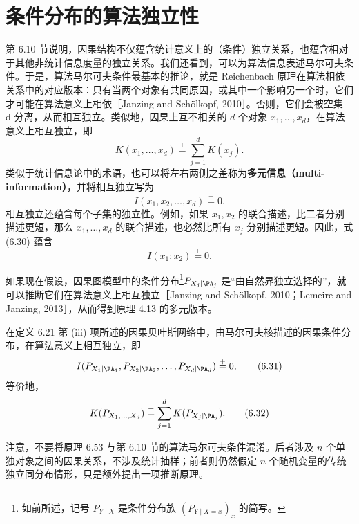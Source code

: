 \section{条件分布的算法独立性}
\label{sec:ch06-aic}

第 6.10 节说明，因果结构不仅蕴含统计意义上的（条件）独立关系，也蕴含相对于其他非统计信息度量的独立关系。我们还看到，可以为算法信息表述马尔可夫条件。于是，算法马尔可夫条件最基本的推论，就是 Reichenbach 原理在算法相依关系中的对应版本：只有当两个对象有共同原因，或其中一个影响另一个时，它们才可能在算法意义上相依［Janzing and Schölkopf, 2010］。否则，它们会被空集 d-分离，从而相互独立。类似地，因果上互不相关的 $d$ 个对象 $x_1,\ldots,x_d$，在算法意义上相互独立，即
\begin{equation}
 K(x_1,\ldots,x_d)\overset{+}{=}\sum_{j=1}^dK(x_j).
 \tag{6.29}
\end{equation}
类似于统计信息论中的术语，也可以将左右两侧之差称为\textbf{多元信息（multi-information）}，并将相互独立写为
\begin{equation}
 I(x_1,x_2,\ldots,x_d)\overset{+}{=}0.
 \tag{6.30}
\end{equation}
相互独立还蕴含每个子集的独立性。例如，如果 $x_1,x_2$ 的联合描述，比二者分别描述更短，那么 $x_1,\ldots,x_d$ 的联合描述，也必然比所有 $x_j$ 分别描述更短。因此，式 (6.30) 蕴含
\[
 I(x_1:x_2)\overset{+}{=}0.
\]

如果现在假设，因果图模型中的条件分布\footnote{如前所述，记号 $P_{Y\mid X}$ 是条件分布族 $(P_{Y\mid X=x})_x$ 的简写。}$P_{X_j\mid\PA_j}$ 是“由自然界独立选择的”，就可以推断它们在算法意义上相互独立［Janzing and Schölkopf, 2010；Lemeire and Janzing, 2013］，从而得到原理 4.13 的多元版本。

\begin{principle}
在定义 6.21 第 (iii) 项所述的因果贝叶斯网络中，由马尔可夫核描述的因果条件分布，在算法意义上相互独立，即
\begin{equation}
 I(P_{X_1\mid\PA_1},P_{X_2\mid\PA_2},\ldots,P_{X_d\mid\PA_d})
 \overset{+}{=}0,
 \tag{6.31}
\end{equation}
等价地，
\begin{equation}
 K(P_{X_1,\ldots,X_d})\overset{+}{=}\sum_{j=1}^dK(P_{X_j\mid\PA_j}).
 \tag{6.32}
\end{equation}
\end{principle}

注意，不要将原理 6.53 与第 6.10 节的算法马尔可夫条件混淆。后者涉及 $n$ 个单独对象之间的因果关系，不涉及统计抽样；前者则仍然假定 $n$ 个随机变量的传统独立同分布情形，只是额外提出一项推断原理。

